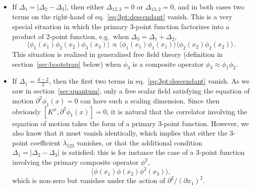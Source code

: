 \documentclass[a4paper,12pt]{article}
\numberwithin{equation}{section}
\begin{document}
\begin{itemize}

\item
If $\Delta_1 = \left| \Delta_2 - \Delta_3 \right|$, then either $\Delta_{12,3} = 0$ or $\Delta_{13,2} = 0$, and in both cases two terms on the right-hand of eq.~\eqref{eq:3pt:descendant} vanish. This is a very special situation in which the primary 3-point function factorizes into a product of 2-point function, e.g.~when $\Delta_3 = \Delta_1 + \Delta_2$,
\begin{equation}
	\langle \phi_1(x_1) \phi_2(x_2) \phi_3(x_3) \rangle
	\propto \langle \phi_1(x_1) \phi_1(x_1) \rangle
	\langle \phi_2(x_2) \phi_2(x_2) \rangle.
\end{equation}
This situation is realized in generalized free field theory (definition in section~\ref{sec:bootstrap} below) when $\phi_3$ is a composite operator $\phi_3 \approx \phi_1 \phi_2$.

\item
If $\Delta_1 = \frac{d-2}{2}$, then the first two terms in eq.~\eqref{eq:3pt:descendant} vanish. As we saw in section~\ref{sec:quantum}, only a free scalar field satisfying the equation of motion $\partial^2 \phi_1(x) = 0$ can have such a scaling dimension. Since then obviously $\left[ K^\mu, \partial^2 \phi_1(x) \right] = 0$, it is natural that the correlator involving the equation of motion takes the form of a primary 3-point function. However, we also know that it must vanish identically, which implies that either the 3-point coefficient $\lambda_{123}$ vanishes, or that the additional condition $\Delta_1 = \left| \Delta_2 - \Delta_3 \right|$ is satisfied: this is for instance the case of a 3-point function involving the primary composite operator $\phi^2$,
\begin{equation}
	\langle \phi(x_1) \phi(x_2) \phi^2(x_3) \rangle,
\end{equation}
which is non-zero but vanishes under the action of $\partial^2/(\partial x_1)^2$.

\end{itemize}
\end{document}
